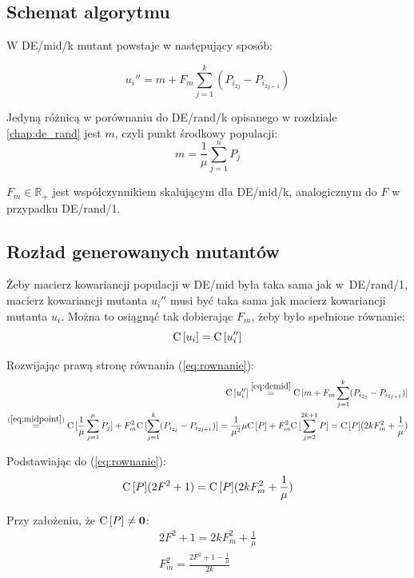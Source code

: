 \documentclass[a4paper,onecolumn,oneside,12pt,wide,floatssmall]{mwrep}
\def\C{{\rm C}\,}
\theoremstyle{definition}
\theoremstyle{plain}%
\theoremstyle{remark}
\begin{document}
\subsection{Schemat algorytmu}

W DE/mid/k mutant powstaje w następujący sposób:

\begin{equation} \label{eq:demid}
u_i'' = m + F_m\sum\limits_{j=1}^k (P_{i_{2j}} - P_{i_{2j+1}})
\end{equation}

Jedyną różnicą w porównaniu do DE/rand/k opisanego w rozdziale \ref{chap:de_rand} jest $m$, czyli punkt środkowy populacji:
\begin{equation} \label{eq:midpoint}
m = \frac{1}{\mu}\sum\limits_{j=1}^n P_j
\end{equation}

$F_m\in\mathbb{R_+}$ jest współczynnikiem skalującym dla DE/mid/k, analogicznym do $F$ 
w przypadku DE/rand/1. 

\subsection{Rozład generowanych mutantów}

Żeby macierz kowariancji populacji w DE/mid była taka sama jak w~DE/rand/1, 
macierz kowariancji mutanta $u_i''$ musi być taka sama jak macierz kowariancji mutanta $u_i$.
Można to osiągnąć tak dobierając $F_m$, żeby było spełnione równanie:
\begin{equation} \label{eq:rownanie}
\C[u_i] = \C[u_i'']
\end{equation}

Rozwijając prawą stronę równania (\ref{eq:rownanie}):
\begin{align*}
\C[u_i''] \overset{\eqref{eq:demid}}{=} \C[m + F_m\sum\limits_{j=1}^k (P_{i_{2j}} - P_{i_{2j+1}})] \\
\overset{(\ref{eq:midpoint})}{=} \C[\frac{1}{\mu}\sum\limits_{j=1}^\mu P_j] + F_m^2\C[\sum\limits_{j=1}^k (P_{i_{2j}} - P_{i_{2j+1}})] 
= \frac{1}{\mu^2}\mu\C[P] + F_m^2\C[\sum\limits_{j=2}^{2k+1} P] = \C[P](2kF_m^2 + \frac{1}{\mu})
\end{align*}

Podstawiając do (\ref{eq:rownanie}):
\begin{align*}
\C[P](2F^2 + 1) = \C[P](2kF_m^2 + \frac{1}{\mu})
\end{align*}

Przy założeniu, że $\C[P] \neq \textbf{0}$:
\begin{align*}
2F^2 + 1 = 2kF_m^2 + \frac{1}{\mu} \\
F_m^2 = \frac{2F^2 + 1 - \frac{1}{\mu}}{2k}
\end{align*}
\end{document}
